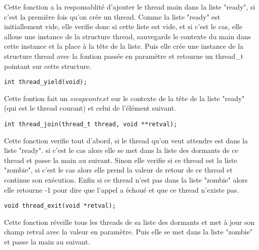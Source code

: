 \documentclass{article}
\begin{document}
Cette fonction a la responsablité d'ajouter le thread main dans la liste "ready", 
si c'est la première fois qu'on crée un thread. 
Comme la liste "ready" est initiallement vide,  elle verifie donc si cette liste est vide, et si c'est le cas, 
elle alloue une instance de la structure thread, 
sauvegarde le contexte du main dans cette instance et la place à la tête de la liste.
Puis elle crée une instance de la structure thread avec la fontion
passée en paramètre et retourne un thread\_t pointant sur cette structure.
~~\\
\begin{verbatim}
int thread_yield(void);
\end{verbatim}
Cette fontion fait un $swapcontext$ sur le contexte de la tête de 
la liste "ready" (qui est le thread courant) et celui de l'élément suivant.
~~\\
\begin{verbatim}
int thread_join(thread_t thread, void **retval);
\end{verbatim}
Cette fonction verifie tout d'abord, si le thread qu'on veut 
attendre est dans la liste "ready". si c'est le cas 
alors elle se met dans la liste des dormants de ce thread et passe la main au suivant.
Sinon elle verifie si ce thread est la liste "zombie", 
si c'est le cas alors elle prend la valeur de retour de ce thread et continue son exécution.
Enfin si ce thread n'est pas dans la liste "zombie" 
alors elle retourne -1 pour dire que l'appel a échoué et que ce thread n'existe pas.
~~\\   
\begin{verbatim}
void thread_exit(void *retval);
\end{verbatim}
Cette fonction réveille tous les threads de sa liste des dormants et
 met à jour son champ retval avec la valeur en paramètre. Puis elle se met dans la liste "zombie" et passe la main au suivant.
\end{document}
